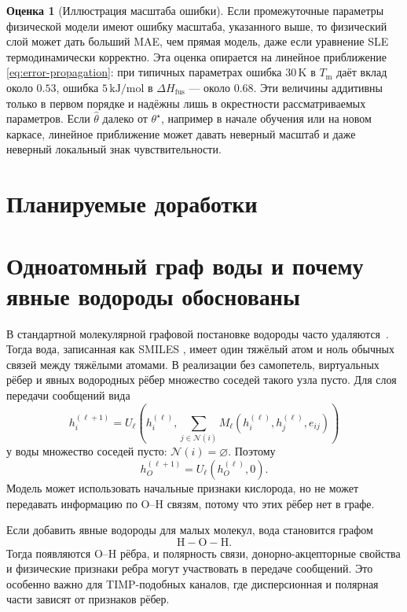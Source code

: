 \documentclass[11pt]{article}
\DeclareRobustCommand{\code}[1]{\texttt{\detokenize{#1}}}
\newcommand{\Tm}{T_{\mathrm m}}
\newcommand{\dHfus}{\Delta H_{\mathrm{fus}}}
\theoremstyle{definition}
\newtheorem{estimate}{Оценка}[section]
\begin{document}
\begin{estimate}[Иллюстрация масштаба ошибки]
Если промежуточные параметры физической модели имеют ошибку масштаба, указанного выше, то физический слой может дать больший MAE, чем прямая модель, даже если уравнение SLE термодинамически корректно. Эта оценка опирается на линейное приближение \eqref{eq:error-propagation}: при типичных параметрах ошибка $30\,\mathrm K$ в $\Tm$ даёт вклад около $0.53$, ошибка $5\,\mathrm{kJ/mol}$ в $\dHfus$ --- около $0.68$. Эти величины аддитивны только в первом порядке и надёжны лишь в окрестности рассматриваемых параметров. Если $\widehat\theta$ далеко от $\theta^\star$, например в начале обучения или на новом каркасе, линейное приближение может давать неверный масштаб и даже неверный локальный знак чувствительности.
\end{estimate}

\section*{Планируемые доработки}

\section{Одноатомный граф воды и почему явные водороды обоснованы}
\label{app:water}

В стандартной молекулярной графовой постановке водороды часто удаляются~\cite{landrum2024,gilmer2017}. Тогда вода, записанная как SMILES \code{O}, имеет один тяжёлый атом и ноль обычных связей между тяжёлыми атомами. В реализации без самопетель, виртуальных рёбер и явных водородных рёбер множество соседей такого узла пусто. Для слоя передачи сообщений вида
\begin{equation*}
    h_i^{(\ell+1)}
    =
    U_\ell\!\left(
        h_i^{(\ell)},
        \sum_{j\in\mathcal N(i)}
        M_\ell(h_i^{(\ell)},h_j^{(\ell)},e_{ij})
    \right)
\end{equation*}
у воды множество соседей пусто: $\mathcal N(i)=\varnothing$. Поэтому
\begin{equation*}
    h_O^{(\ell+1)}=U_\ell(h_O^{(\ell)},0).
\end{equation*}
Модель может использовать начальные признаки кислорода, но не может передавать информацию по O--H связям, потому что этих рёбер нет в графе.

Если добавить явные водороды для малых молекул, вода становится графом
\begin{equation*}
    \mathrm{H{-}O{-}H}.
\end{equation*}
Тогда появляются O--H рёбра, и полярность связи, донорно-акцепторные свойства и физические признаки ребра могут участвовать в передаче сообщений. Это особенно важно для TIMP-подобных каналов, где дисперсионная и полярная части зависят от признаков рёбер.
\end{document}
